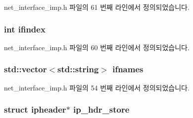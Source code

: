net\+\_\+interface\+\_\+imp.\+h 파일의 61 번째 라인에서 정의되었습니다.

\subsubsection[{\texorpdfstring{ifindex}{ifindex}}]{\setlength{\rightskip}{0pt plus 5cm}int ifindex\hspace{0.3cm}{\ttfamily [private]}}\hypertarget{classavdecc__lib_1_1net__interface__imp_a01e636f8746c84f1cf3d45c4afbfde35}{}\label{classavdecc__lib_1_1net__interface__imp_a01e636f8746c84f1cf3d45c4afbfde35}


net\+\_\+interface\+\_\+imp.\+h 파일의 60 번째 라인에서 정의되었습니다.

\subsubsection[{\texorpdfstring{ifnames}{ifnames}}]{\setlength{\rightskip}{0pt plus 5cm}std\+::vector$<$std\+::string$>$ ifnames\hspace{0.3cm}{\ttfamily [private]}}\hypertarget{classavdecc__lib_1_1net__interface__imp_a00031dfb5f1a1ca3fc12dd11b601030a}{}\label{classavdecc__lib_1_1net__interface__imp_a00031dfb5f1a1ca3fc12dd11b601030a}


net\+\_\+interface\+\_\+imp.\+h 파일의 54 번째 라인에서 정의되었습니다.

\subsubsection[{\texorpdfstring{ip\+\_\+hdr\+\_\+store}{ip_hdr_store}}]{\setlength{\rightskip}{0pt plus 5cm}struct {\bf ipheader}$\ast$ ip\+\_\+hdr\+\_\+store\hspace{0.3cm}{\ttfamily [private]}}\hypertarget{classavdecc__lib_1_1net__interface__imp_a81b4fd9a03787b74d75e40b6c673e187}{}\label{classavdecc__lib_1_1net__interface__imp_a81b4fd9a03787b74d75e40b6c673e187}


